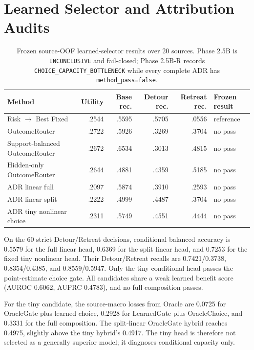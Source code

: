 \section{Learned Selector and Attribution Audits}
\label{app:learned}

\begin{table}[H]
\centering
\small
\begin{tabular}{@{}lrrrrl@{}}
\toprule
Method & Utility & Base rec. & Detour rec. & Retreat rec. & Frozen result \\
\midrule
Risk $\rightarrow$ Best Fixed & .2544 & .5595 & .5705 & .0556 & reference \\
OutcomeRouter & .2722 & .5926 & .3269 & .3704 & no pass \\
Support-balanced OutcomeRouter & .2672 & .6534 & .3013 & .4815 & no pass \\
Hidden-only OutcomeRouter & .2644 & .4881 & .4359 & .5185 & no pass \\
ADR linear full & .2097 & .5874 & .3910 & .2593 & no pass \\
ADR linear split & .2222 & .4999 & .4487 & .3704 & no pass \\
ADR tiny nonlinear choice & .2311 & .5749 & .4551 & .4444 & no pass \\
\bottomrule
\end{tabular}
\caption{Frozen source-OOF learned-selector results over 20 sources. Phase 2.5B is
\texttt{INCONCLUSIVE} and fail-closed; Phase 2.5B-R records
\texttt{CHOICE\_CAPACITY\_BOTTLENECK} while every complete ADR has
\texttt{method\_pass=false}.}
\label{tab:method-null}
\end{table}

On the 60 strict Detour/Retreat decisions, conditional balanced accuracy is
0.5579 for the full linear head, 0.6369 for the split linear head, and 0.7253
for the fixed tiny nonlinear head. Their Detour/Retreat recalls are
0.7421/0.3738, 0.8354/0.4385, and 0.8559/0.5947. Only the tiny conditional head
passes the point-estimate choice gate. All candidates share a weak learned
benefit score (AUROC 0.6062, AUPRC 0.4783), and no full composition passes.

For the tiny candidate, the source-macro losses from Oracle are 0.0725 for
OracleGate plus learned choice, 0.2928 for LearnedGate plus OracleChoice, and
0.3331 for the full composition. The split-linear OracleGate hybrid reaches
0.4975, slightly above the tiny hybrid's 0.4917. The tiny head is therefore not
selected as a generally superior model; it diagnoses conditional capacity only.


